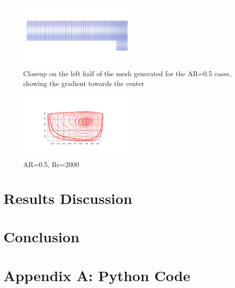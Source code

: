 \documentclass[twocolumn,10pt]{asme2ej}
\begin{document}
\begin{figure}[tb]
\begin{center}
\includegraphics[width=0.5\textwidth]{figure/half_grid.pdf}
\caption{Closeup on the left half of the mesh generated for the AR=0.5 cases, showing the gradient towards the center}
\label{grid_figure}
\end{center}
\end{figure}

\begin{figure}[tb]
\begin{center}
\includegraphics[width=0.5\textwidth]{figure/AR0.5-Re2000 streamFunction axis final.pdf}
\caption{AR=0.5, Re=2000}
\label{}
\end{center}
\end{figure}



\section{Results Discussion}

\section{Conclusion}

\nocite{*}



\clearpage
\onecolumn
\appendix       %
\section*{Appendix A: Python Code}



\end{document}
